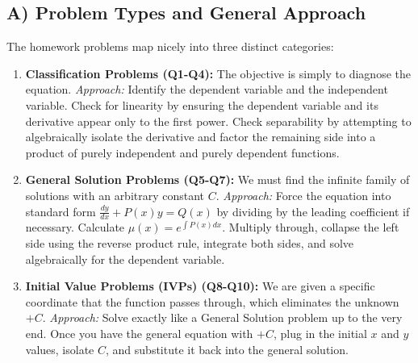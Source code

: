 \documentclass[11pt]{article}
\begin{document}
\subsection{A) Problem Types and General Approach}
The homework problems map nicely into three distinct categories:
\begin{enumerate}
    \item \textbf{Classification Problems (Q1-Q4):} The objective is simply to diagnose the equation. 
    \textit{Approach:} Identify the dependent variable and the independent variable. Check for linearity by ensuring the dependent variable and its derivative appear only to the first power. Check separability by attempting to algebraically isolate the derivative and factor the remaining side into a product of purely independent and purely dependent functions.
    \item \textbf{General Solution Problems (Q5-Q7):} We must find the infinite family of solutions with an arbitrary constant $C$.
    \textit{Approach:} Force the equation into standard form $\frac{dy}{dx} + P(x)y = Q(x)$ by dividing by the leading coefficient if necessary. Calculate $\mu(x) = e^{\int P(x)dx}$. Multiply through, collapse the left side using the reverse product rule, integrate both sides, and solve algebraically for the dependent variable.
    \item \textbf{Initial Value Problems (IVPs) (Q8-Q10):} We are given a specific coordinate that the function passes through, which eliminates the unknown $+C$. 
    \textit{Approach:} Solve exactly like a General Solution problem up to the very end. Once you have the general equation with $+C$, plug in the initial $x$ and $y$ values, isolate $C$, and substitute it back into the general solution.
\end{enumerate}
\end{document}
